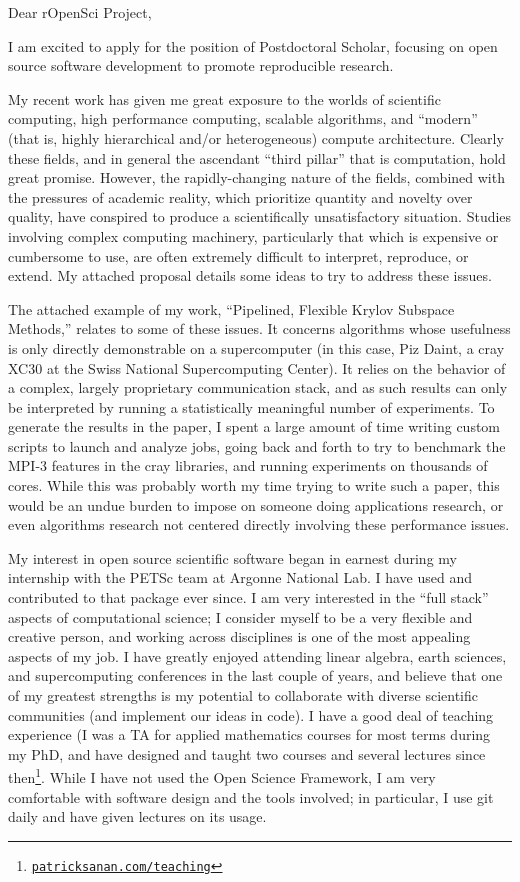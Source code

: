 \documentclass{letter}
\begin{document}
\begin{letter}{}
\opening{Dear rOpenSci Project,}

I am excited to apply for the position of Postdoctoral Scholar, focusing on open source software development to promote reproducible research.

  My recent work has given me great exposure to the worlds of scientific computing, high performance computing, scalable algorithms, and ``modern'' (that is, highly hierarchical and/or heterogeneous) compute architecture. 
 Clearly these fields, and in general the ascendant ``third pillar'' that is computation, hold great promise.
  However, the rapidly-changing nature of the fields, combined with the pressures of academic reality, which prioritize quantity and novelty over quality, have conspired to produce a scientifically unsatisfactory situation. 
  Studies involving complex computing machinery, particularly that which is expensive or cumbersome to use, are often extremely difficult to interpret, reproduce, or extend. My attached proposal details some ideas to try to address these issues.

  The attached example of my work, ``Pipelined, Flexible Krylov Subspace Methods,'' relates to  some of these issues.
  It concerns algorithms whose usefulness is only directly demonstrable on a supercomputer (in this case, Piz Daint, a cray XC30 at the Swiss National Supercomputing Center). 
  It relies on the behavior of a complex, largely proprietary communication stack, and as such results can only be interpreted by running a statistically meaningful number of experiments.
  To generate the results in the paper, I spent a large amount of time writing custom scripts to launch and analyze jobs, going back and forth to try to benchmark the MPI-3 features in the cray libraries, and running experiments on thousands of cores.
  While this was probably worth my time trying to write such a paper, this would be an undue burden to impose on someone doing applications research, or even algorithms research not centered directly involving these performance issues.

  My interest in open source scientific software began in earnest during my internship with the PETSc team at Argonne National Lab. I have used and contributed to that package ever since.
  I am very interested in the ``full stack'' aspects of computational science; I consider myself to be a very flexible and creative person, and working across disciplines is one of the most appealing aspects of my job. I have greatly enjoyed attending linear algebra, earth sciences, and supercomputing conferences in the last couple of years, and believe that one of my greatest strengths is my potential to collaborate with diverse scientific communities (and implement our ideas in code).
  I have a good deal of teaching experience (I was a TA for applied mathematics courses for most terms during my PhD, and have designed and taught two courses and several lectures since then\footnote{\href{http://www.patricksanan.com/teaching}{\texttt{patricksanan.com/teaching}}}.
  While I have not used the Open Science Framework, I am very comfortable with software design and the tools involved; in particular, I use git daily and have given lectures on its usage.


\end{letter}
\end{document}
